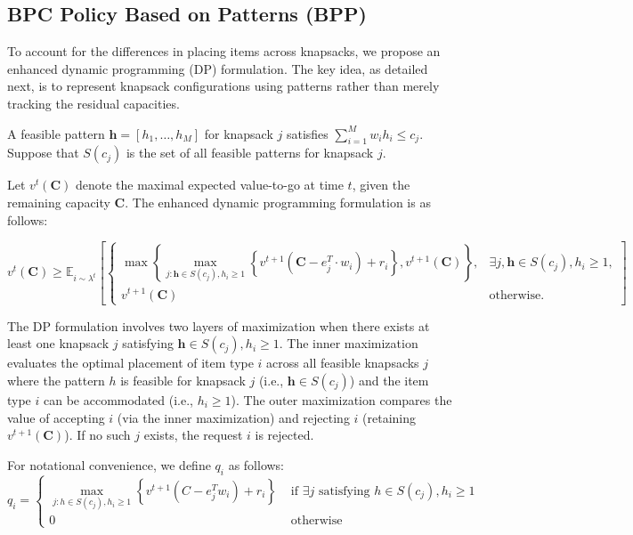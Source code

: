 \subsection{BPC Policy Based on Patterns (BPP)}
To account for the differences in placing items across knapsacks, we propose an enhanced dynamic programming (DP) formulation. The key idea, as detailed next, is to represent knapsack configurations using patterns rather than merely tracking the residual capacities.

A feasible pattern $\bm{h} = [h_{1}, \ldots, h_{M}]$ for knapsack $j$ satisfies $\sum_{i=1}^{M} w_{i} h_{i} \leq c_{j}$. Suppose that $S(c_{j})$ is the set of all feasible patterns for knapsack $j$. 

Let $v^t(\bm{C})$ denote the maximal expected value-to-go at time $t$, given the remaining capacity $\bm{C}$. The enhanced dynamic programming formulation is as follows:

\begin{equation}
v^t(\bm{C}) \geq \mathbb{E}_{i \sim \lambda^t}\left[\left\{
\begin{array}{ll}
\max \left\{\max _{j: \bm{h} \in S(c_j), h_i \geq 1}\left\{v^{t+1}\left(\bm{C}-e_j^T \cdot w_i\right)+r_i\right\}, v^{t+1}(\bm{C})\right\}, & \exists j, \bm{h} \in S(c_j), h_i \geq 1, \\
v^{t+1}(\bm{C}) & \text{otherwise}.
\end{array}\right]\right.
\end{equation}


The DP formulation involves two layers of maximization when there exists at least one knapsack $j$ satisfying $\bm{h} \in S(c_j), h_{i} \geq 1$. The inner maximization evaluates the optimal placement of item type $i$ across all feasible knapsacks $j$ where the pattern $h$ is feasible for knapsack $j$ (i.e., $\bm{h} \in S(c_{j})$) and the item type $i$ can be accommodated (i.e., $h_{i} \geq 1$). The outer maximization compares the value of accepting $i$ (via the inner maximization) and rejecting $i$ (retaining $v^{t+1}(\bm{C})$). If no such $j$ exists, the request $i$ is rejected.


For notational convenience, we define $q_i$ as follows:
\begin{equation*}
    q_i= \begin{cases}\max _{j: h \in S\left(c_j\right), h_i \geq 1}\left\{v^{t+1}\left(C-e_j^T w_i\right)+r_i\right\} & \text { if } \exists j \text{ satisfying } h \in S\left(c_j\right), h_i \geq 1 \\ 0 & \text { otherwise }\end{cases}
\end{equation*}

